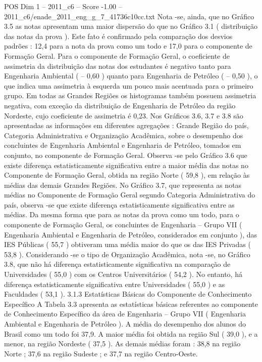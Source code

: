 \begin{textsample}{POS Dim 1 – 2011\_c6 – Score -1.00 – 2011\_c6/enade\_2011\_eng\_g\_7\_41736c10cc.txt}
Nota -se, ainda, que no Gráfico 3.5 as notas apresentam uma maior dispersão do que no Gráfico 3.1 ( distribuição das notas da prova ).
Este fato é confirmado pela comparação dos desvios padrões : 12,4 para a nota da prova como um todo e 17,0 para o componente de Formação Geral.
Para o componente de Formação Geral, o coeficiente de assimetria da distribuição das notas dos estudantes é negativo tanto para Engenharia Ambiental ( – 0,60 ) quanto para Engenharia de Petróleo ( – 0,50 ), o que indica uma assimetria à esquerda um pouco mais acentuada para o primeiro grupo.
Em todas as Grandes Regiões os histogramas também possuem assimetria negativa, com exceção da distribuição de Engenharia de Petróleo da região Nordeste, cujo coeficiente de assimetria é 0,23.
Nos Gráficos 3.6, 3.7 e 3.8 são apresentadas as informações em diferentes agregações : Grande Região do país, Categoria Administrativa e Organização Acadêmica, sobre o desempenho dos concluintes de Engenharia Ambiental e Engenharia de Petróleo, tomados em conjunto, no componente de Formação Geral.
Observa -se pelo Gráfico 3.6 que existe diferença estatisticamente significativa entre a maior média das notas no Componente de Formação Geral, obtida na região Norte ( 59,8 ), em relação às médias das demais Grandes Regiões.
No Gráfico 3.7, que representa as notas médias no Componente de Formação Geral segundo Categoria Administrativa do país, observa -se que existe diferença estatisticamente significativa entre as médias.
Da mesma forma que para as notas da prova como um todo, para o componente de Formação Geral, os concluintes de Engenharia – Grupo VII ( Engenharia Ambiental e Engenharia de Petróleo, considerados em conjunto ), das IES Públicas ( 55,7 ) obtiveram uma média maior do que os das IES Privadas ( 53,8 ).
Considerando -se o tipo de Organização Acadêmica, nota -se, no Gráfico 3.8, que não há diferença estatisticamente significativa na comparação de Universidades ( 55,0 ) com os Centros Universitários ( 54,2 ).
No entanto, há diferença estatisticamente significativa entre Universidades ( 55,0 ) e as Faculdades ( 53,1 ). 3.1.3 Estatísticas Básicas do Componente de Conhecimento Específico A Tabela 3.3 apresenta as estatísticas básicas referentes ao componente de Conhecimento Específico da área de Engenharia – Grupo VII ( Engenharia Ambiental e Engenharia de Petróleo ).
A média do desempenho dos alunos do Brasil como um todo foi 37,9.
A maior média foi obtida na região Sul ( 39,0 ), e a menor, na região Nordeste ( 37,5 ).
As demais médias foram : 38,8 na região Norte ; 37,6 na região Sudeste ; e 37,7 na região Centro-Oeste.

\end{textsample}
